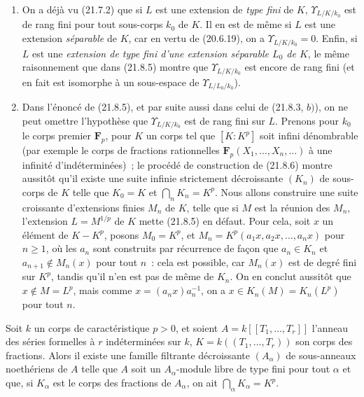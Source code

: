 \begin{remarks}[21.8.7]
\label{0.21.8.7-fr}
\begin{enumerate}
  \item[(i)] On a déjà vu (21.7.2) que si $L$ est une extension de
  \emph{type fini} de $K$, $\Upsilon_{L/K/k_0}$ est de rang fini pour tout
  sous-corps $k_0$ de $K$. Il en est de même si $L$ est une extension
  \emph{séparable} de $K$, car en vertu de (20.6.19), on a
  $\Upsilon_{L/K/k_0}=0$. Enfin, si $L$ est une \emph{extension de type fini
  d'une extension séparable $L_0$ de $K$}, le même raisonnement que dans
  (21.8.5) montre que $\Upsilon_{L/K/k_0}$ est encore de rang fini (et en fait
  est isomorphe à un sous-espace de $\Upsilon_{L/L_0/k_0}$).

  \item[(ii)] Dans l'énoncé de (21.8.5), et par suite aussi dans celui de
  (21.8.3, $b)$), on ne peut omettre l'hypothèse que $\Upsilon_{L/K/k_0}$ est
  de rang fini sur $L$. Prenons pour $k_0$ le corps premier $\mathbf F_p$,
  pour $K$ un corps tel que $[K:K^p]$ soit infini dénombrable (par exemple le
  corps de fractions rationnelles $\mathbf F_p(X_1,\ldots,X_n,\ldots)$ à une
  infinité d'indéterminées)~; le procédé de construction de (21.8.6) montre
  aussitôt qu'il existe une suite infinie strictement décroissante $(K_n)$ de
  sous-corps de $K$ telle que $K_0=K$ et $\bigcap_nK_n=K^p$. Nous allons
  construire une suite croissante d'extensions finies $M_n$ de $K$, telle que
  si $M$ est la réunion des $M_n$, l'extension $L=M^{1/p}$ de $K$ mette
  (21.8.5) en défaut. Pour cela, soit $x$ un élément de $K-K^p$, posons
  $M_0=K^p$, et $M_n=K^p(a_1x,a_2x,\ldots,a_nx)$ pour $n\geqslant1$, où les
  $a_n$ sont construits par récurrence de façon que $a_n\in K_n$ et
  $a_{n+1}\notin M_n(x)$ pour tout $n$~: cela est possible, car $M_n(x)$ est
  de degré fini sur $K^p$, tandis qu'il n'en est pas de même de $K_n$. On en
  conclut aussitôt que $x\notin M=L^p$, mais comme
  $x=(a_nx)a_n^{-1}$, on a $x\in K_n(M)=K_n(L^p)$ pour tout $n$.
\end{enumerate}
\end{remarks}

\begin{proposition}[21.8.8]
\label{0.21.8.8-fr}
Soit $k$ un corps de caractéristique $p>0$, et soient
$A=k[[T_1,\ldots,T_r]]$ l'anneau des séries formelles à $r$ indéterminées sur
$k$, $K=k((T_1,\ldots,T_r))$ son corps des fractions. Alors il existe une
famille filtrante décroissante $(A_\alpha)$ de sous-anneaux noethériens de $A$
telle que $A$ soit un $A_\alpha$-module libre de type fini pour tout $\alpha$
et que, si $K_\alpha$ est le corps des fractions de $A_\alpha$, on ait
$\bigcap_\alpha K_\alpha=K^p$.
\end{proposition}

